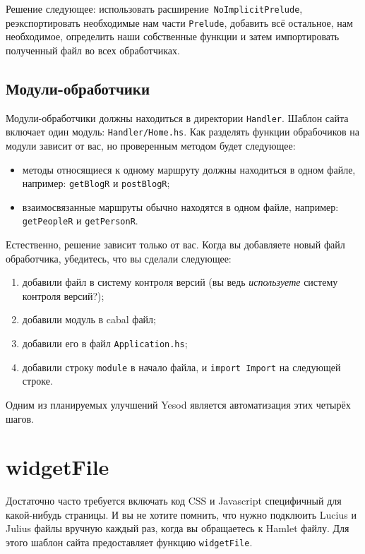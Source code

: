 Решение следующее: использовать расширение~\lstinline!NoImplicitPrelude!,
реэкспортировать необходимые нам части \lstinline!Prelude!, добавить всё
остальное, нам необходимое, определить наши собственные функции и затем
импортировать полученный файл во всех обработчиках.

\subsection{Модули-обработчики}

Модули-обработчики должны находиться в директории \lstinline!Handler!. Шаблон сайта включает один
модуль: \lstinline!Handler/Home.hs!. Как разделять функции обрабочиков на модули зависит от вас, но
проверенным методом будет следующее:
\begin{itemize}
  \item методы относящиеся к одному маршруту должны находиться в одном файле, например: \lstinline!getBlogR!
    и \lstinline!postBlogR!;
  \item взаимосвязанные маршруты обычно находятся в одном файле, например: \lstinline!getPeopleR! и \lstinline!getPersonR!.
\end{itemize}

Естественно, решение зависит только от вас. Когда вы добавляете новый файл обработчика, убедитесь,
что вы сделали следующее:
\begin{enumerate}
  \item добавили файл в систему контроля версий (вы ведь \emph{используете} систему контроля версий?);
  \item добавили модуль в cabal файл;
  \item добавили его в файл \texttt{Application.hs};
  \item добавили строку \lstinline!module! в начало файла, и \lstinline!import Import! на следующей строке.
\end{enumerate}

\begin{remark}
  Одним из планируемых улучшений Yesod является автоматизация этих четырёх шагов.
\end{remark}

\section{widgetFile}

Достаточно часто требуется включать код CSS и Javascript специфичный для какой-нибудь страницы.
И вы не хотите помнить, что нужно подклюить Lucius и Julius файлы вручную каждый раз,
когда вы обращаетесь к Hamlet файлу. Для этого шаблон сайта предоставляет
функцию \lstinline!widgetFile!.


